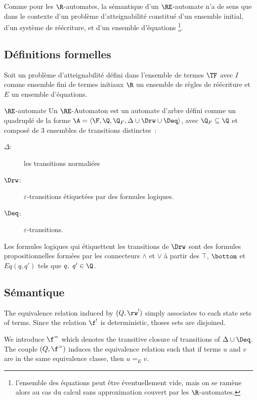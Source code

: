 Comme pour les $\R$-automates, la sémantique d'un $\RE$-automate n'a de sens que dans le contexte d'un problème d'atteignabilité
constitué d'un ensemble initial, d'un système de réécriture, et d'un ensemble d'équations
\footnote{\footnotesize l'ensemble des équations peut être éventuellement vide, mais on se ramène alors au cas du calcul 
  sans approximation couvert par les $\R$-automates.}.

\subsection{Définitions formelles}
Soit un problème d'atteignabilité défini dans l'ensemble de termes $\TF$ avec 
$I$ comme ensemble fini de termes initiaux $\R$ un ensemble de règles de réécriture
et $E$ un ensemble d'équations.

\begin{definition}{$\RE$-automate}
  \label{def:RE-automaton}
  Un $\RE$-Automaton est un automate d'arbre défini comme un quadruplé de la forme
  $\A= \langle \F, \Q, \Q_F,\Delta \cup \Drw \cup \Deq\rangle$,
  avec $\Q_F \subseteq \Q$ et composé de 3 ensembles de transitions distinctes~:

  \begin{description}
  \item [$\Delta$:] les transitions normaliées
  \item [$\Drw$:] $\varepsilon$-transitions étiquetées par des formules logiques.
  \item [$\Deq$:] $\varepsilon$-transitions.
  \end{description}

  Les formules logiques qui étiquettent les transitions de $\Drw$ sont des formules propositionnelles
  formées par les connecteurs $\land$ et $\lor$ à partir des $\top$, $\bottom$ et $Eq(q, q')$ tels que $q,\ q' \in \Q$.
\end{definition}


\subsection{Sémantique}

The equivalence relation induced by $(Q, \rw^!)$ simply associates to each state sets of terms.
Since the relation $\f^!$ is deterministic, thoses sets are disjoined.

We introduce $\f^=$ which denotes the transitive closure of transitions of $\Delta \cup \Deq$.
The couple $(Q, \f^=)$ induces the equivalence relation such that if terms $u$ and $v$
are in the same equivalence classe, then $u =_E v$.

